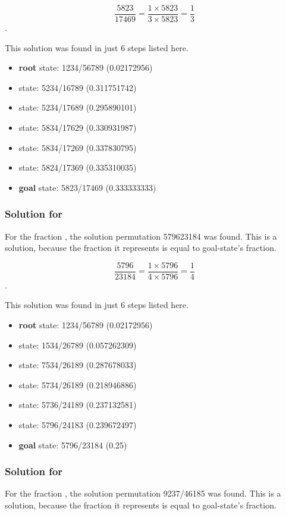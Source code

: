 \documentclass{article}
\begin{document}
\[\frac{5823}{17469} = \frac{1 \times 5823}{3 \times 5823} =
\frac{1}{3}\].

This solution was found in just 6 steps listed here.

\begin{itemize}
  \item \textbf{root} state: 1234/56789 (0.02172956) 
  \item state: 5234/16789 (0.311751742)
  \item state: 5234/17689 (0.295890101)
  \item state: 5834/17629 (0.330931987)
  \item state: 5834/17269 (0.337830795)
  \item state: 5824/17369 (0.335310035)
  \item \textbf{goal} state: 5823/17469 (0.333333333)
\end{itemize}

\subsubsection{Solution for }

For the fraction , the solution permutation 579623184 was
found. This is a solution, because the fraction it represents is equal to
goal-state's fraction.

\[\frac{5796}{23184} = \frac{1 \times 5796}{4 \times 5796}
= \frac{1}{4}\].

This solution was found in just 6 steps listed here.

\begin{itemize}
  \item \textbf{root} state: 1234/56789 (0.02172956) 
  \item state: 1534/26789 (0.057262309)
  \item state: 7534/26189 (0.287678033)
  \item state: 5734/26189 (0.218946886)
  \item state: 5736/24189 (0.237132581)
  \item state: 5796/24183 (0.239672497)
  \item \textbf{goal} state: 5796/23184 (0.25)
\end{itemize}

\subsubsection{Solution for }

For the fraction , the solution permutation 9237/46185 was
found. This is a solution, because the fraction it represents is equal to
goal-state's fraction.
\end{document}

